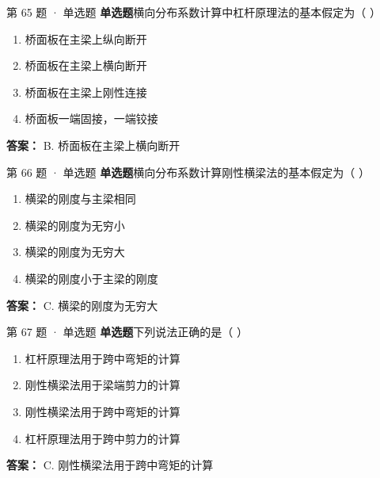 \documentclass[UTF8,zihao=-4,openany]{ctexbook}
\newenvironment{choices}{\begin{enumerate}[label=\Alph*.,leftmargin=9mm,labelsep=3mm,itemsep=2pt,topsep=4pt]}{\end{enumerate}}
\newcommand{\qtype}[1]{\textcolor{brand}{\sffamily\bfseries #1}}
\begin{document}
\begin{questionbox}{第 65 题 · 单选题}
\qtype{单选题}\quad 横向分布系数计算中杠杆原理法的基本假定为（ ）
\begin{choices}
\item 桥面板在主梁上纵向断开
\item 桥面板在主梁上横向断开
\item 桥面板在主梁上刚性连接
\item 桥面板一端固接，一端铰接
\end{choices}
\begin{answerbox}
\textbf{答案：} B. 桥面板在主梁上横向断开
\end{answerbox}
\end{questionbox}

\begin{questionbox}{第 66 题 · 单选题}
\qtype{单选题}\quad 横向分布系数计算刚性横梁法的基本假定为（ ）
\begin{choices}
\item 横梁的刚度与主梁相同
\item 横梁的刚度为无穷小
\item 横梁的刚度为无穷大
\item 横梁的刚度小于主梁的刚度
\end{choices}
\begin{answerbox}
\textbf{答案：} C. 横梁的刚度为无穷大
\end{answerbox}
\end{questionbox}

\begin{questionbox}{第 67 题 · 单选题}
\qtype{单选题}\quad 下列说法正确的是（ ）
\begin{choices}
\item 杠杆原理法用于跨中弯矩的计算
\item 刚性横梁法用于梁端剪力的计算
\item 刚性横梁法用于跨中弯矩的计算
\item 杠杆原理法用于跨中剪力的计算
\end{choices}
\begin{answerbox}
\textbf{答案：} C. 刚性横梁法用于跨中弯矩的计算
\end{answerbox}
\end{questionbox}
\end{document}
